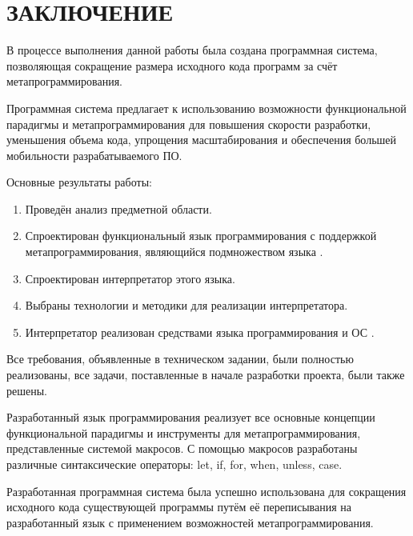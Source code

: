 \section*{ЗАКЛЮЧЕНИЕ}

В процессе выполнения данной работы была создана программная система, позволяющая сокращение размера исходного кода программ за счёт метапрограммирования.

Программная система предлагает к использованию возможности функциональной парадигмы и метапрограммирования для повышения скорости разработки, уменьшения объема кода, упрощения масштабирования и обеспечения большей мобильности разрабатываемого ПО.

Основные результаты работы:
\begin{enumerate}
	\item Проведён анализ предметной области.
	\item Спроектирован функциональный язык программирования с поддержкой метапрограммирования, являющийся подмножеством языка .
	\item Спроектирован интерпретатор этого языка.
	\item Выбраны технологии и методики для реализации интерпретатора.
	\item Интерпретатор реализован средствами языка программирования  и ОС .
\end{enumerate}


Все требования, объявленные в техническом задании, были полностью реализованы, все задачи, поставленные в начале разработки проекта, были также решены.

Разработанный язык программирования реализует все основные концепции функциональной парадигмы и инструменты для метапрограммирования, представленные системой макросов. С помощью макросов разработаны различные синтаксические операторы: let, if, for, when, unless, case.

Разработанная программная система была успешно использована для сокращения исходного кода существующей программы путём её переписывания на разработанный язык с применением возможностей метапрограммирования.